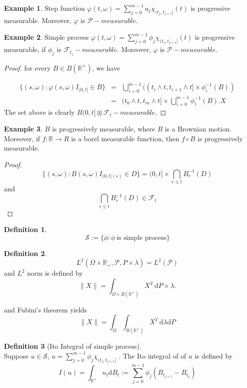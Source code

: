 \documentclass[12pt]{book}
\theoremstyle{definition}
\newtheorem{definition}{Definition}[chapter]
\newtheorem{example}{Example}[chapter]
\newcommand{\R}{\mathbb{R}}
\newcommand{\D}{\mathrm{d}}
\begin{document}
\begin{example}
Step function $\varphi(t,\omega)= \sum_{j=0}^{m-1}a_j \chi_{(t_j,t_{j+1}]}(t)$ is progressive measurable. Moreover, $\varphi $ is $ \mathcal P - measurable$.
\end{example}

\begin{example}
Simple process $\varphi(t,\omega)= \sum_{j=0}^{m-1}\phi_j \chi_{(t_j,t_{j+1}]}(t)$ is progressive measurable, if $\phi_j$ is $\mathcal{F}_{t_j}-measurable$. Moreover, $\varphi $ is $ \mathcal P - measurable$.
\end{example}
\begin{proof}
for every $B \in B(\R^+)$, we have

\begin{eqnarray*}
\{(s,\omega):\varphi(s,\omega)I_{(0,t]}\in B\} &=& \bigcup_{i=0}^{m-1} ((t_i\wedge t,t_{i+1}\wedge t] \times \phi^{-1}_i(B))	\\
&=& (t_0 \wedge t, t_m \wedge t] \times \bigcup_{i=0}^{m-1} \phi_i^{-1}(B). X
\end{eqnarray*} 
The set above is clearly $B(0,t] \otimes \mathcal{F}_t - measurable$.

\end{proof}

\begin{example}
$B$ is progressively measurable, where $B$ is a Brownian motion.	 Moreover, if $f:\R \to R$ is a borel measurable function, then $f \circ B$ is progressively measurable.
\end{example}
\begin{proof}
$$
\{(s,\omega): B(s,\omega)I_{(0,t](s)}\in D\} = (0,t] \times \bigcap_{r\leq t}B_r^{-1}(D)
$$
and 
$$
\bigcap_{r\leq t}B_r^{-1}(D) \in \mathcal{F}_t
$$
\end{proof}

\begin{definition}
$$
\mathcal{S} := \{\phi: \phi \ \text{is simple process}\}
$$
\end{definition}

\begin{definition} 
	$$
	L^2(\Omega \times \R_+, \mathcal{P},P\times\lambda) = L^2(\mathcal P)
	$$
and $L^2$ norm is defined by
$$
\| X\|= \int_{\Omega \times B(\R^+)} X^2\  \D P \times \lambda.
$$
\end{definition}
and Fubini's theorem yields
$$
\| X \| = \int_\Omega \int_{B(\R^+)} X^2 \ \D \lambda \D P
$$



\begin{definition}[Ito Integral of simple process] \ \\
Suppose $u \in \mathcal S$, $u = \sum_{j=0}^{m-1}\phi_j \chi_{(t_j,t_{j+1}]}$
. The Ito integral of of $u$ is defined by
$$
I(u) = \int_{\R^+} u_t \D B_t := \sum_{j=0}^{m-1} \phi_j(B_{t_{j+1}}-B_{t_j})
$$	
\end{definition}
\end{document}
